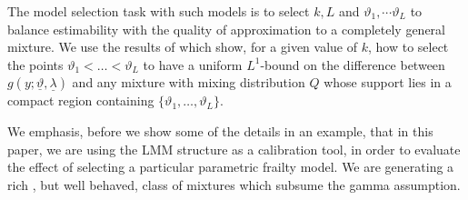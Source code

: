 \documentclass[graybox]{svmult}
\begin{document}
 The model selection task with such models is to select $k, L$ and $\vartheta_1,\cdots\vartheta_L$ to balance estimability with the quality
 of approximation to a completely general mixture.  We use the results of \cite[Section 2.1]{Maroufy2016a} which show, for a given value of $k$, how to select the points $\vartheta_1 < \dots < \vartheta_L$  to have a uniform  $L^1$-bound on   the difference between $g(y;\underline{\vartheta},\underline{\lambda})$ and any mixture with mixing distribution $Q$ whose support lies in a compact region containing  $\{\vartheta_1, \dots,  \vartheta_L\}$.
 
 We emphasis,  before we show some of the details in an example, that in this paper, we are using the LMM structure as a calibration tool, in order to evaluate the effect of selecting a particular parametric frailty model. We are generating a rich , but well behaved, class of mixtures which subsume the gamma assumption. 
\end{document}
